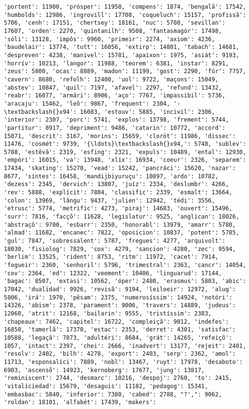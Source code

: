 \documentclass[11pt]{article}
\begin{document}
\begin{Verbatim}[commandchars=\\\{\}]
'portent': 11900, 'prósper': 11950, 'compens': 1874, 'bengalã': 17542, 'humbolds': 12986, 'ingrovill': 17708, 'coqueluch': 15157, 'profissã': 5706, 'cenh': 17151, 'chertsey': 18161, 'nuc': 5708, 'sevillan': 17607, 'orden': 2270, 'quintanilh': 9508, 'fantasmagór': 17498, 'sóli': 13128, 'impôs': 9960, 'primeir': 2274, 'axiom': 4236, 'baudelair': 13774, 'tutt': 16056, 'extirp': 14801, 'tabach': 14681, 'despreven': 4238, 'manivel': 15781, 'apaixon': 1975, 'asiát': 9193, 'horrív': 10213, 'langor': 11988, 'teorem': 6381, 'instar': 8291, 'zeus': 5800, 'ocas': 8889, 'madon': 11199, 'gost': 2290, 'fúr': 7757, 'cavern': 8680, 'refolh': 12400, 'uol': 9722, 'maçons': 15049, 'abstev': 10847, 'quil': 7197, 'afavel': 2297, 'refund': 13432, 'reabr': 16077, 'armári': 8906, 'aço': 7767, 'impassibil': 5736, 'aracaju': 15462, 'leõ': 9867, 'frequent': 2304, '-\textbackslash{}x94': 16083, 'estouv': 5885, 'incivil': 2306, 'interior': 2307, 'porc': 5741, 'explos': 13798, 'frement': 5744, 'partitur': 8917, 'depriment': 9486, 'catarin': 10772, 'accord': 15071, 'descrit': 3167, 'morins': 15659, 'clorót': 11986, 'dissec': 11476, 'cosmét': 9739, '{\ldots}\textbackslash{}x94,': 5748, 'sublev': 5788, 'estêvã': 2319, 'esfing': 2321, 'expuls': 10489, 'ental': 12930, 'empóri': 16015, 'va': 13948, 'xlix': 16934, 'coeur': 2326, 'separem': 17434, 'skating': 15270, 'vead': 15242, 'pancráci': 15620, 'nazar': 8677, 'síntes': 16458, 'mandijbiyuruçu': 10897, 'ardo': 10782, 'dezess': 2345, 'dervich': 13807, 'juíz': 2334, 'deslumbr': 4266, 'rev': 5888, 'explícit': 7804, 'classific': 2339, 'esmalt': 13664, 'colon': 13969, 'lângu': 9437, 'julien': 12942, 'tédi': 3556, 'etrusc': 5774, 'metrific': 4273, 'piraj': 14683, 'ouvert': 15496, 'surr': 7816, 'facçõ': 11628, 'legislatur': 9525, 'anglican': 18026, 'abstraçõ': 9700, 'esbarr': 2350, 'honorabl': 13979, 'amarr': 5780, 'almad': 11682, 'encanec': 7822, 'oposicion': 10837, 'potent': 5785, 'gul': 7847, 'sobressalent': 5787, 'fregues': 4277, 'arquivolt': 18030, 'fisiolog': 7829, 'cox': 4279, 'sancion': 4280, 'zec': 9594, 'berlim': 13525, 'rident': 8753, 'ritm': 11972, 'cacet': 7914, 'fogueir': 2360, 'senhoril': 5796, 'trimestral': 2363, 'cancr': 14054, 'cov': 2364, 'ed': 12322, 'veement': 10406, 'linguarud': 17144, 'bagac': 8507, 'extasi': 10562, 'óper': 2480, 'erasmus': 5803, 'abic': 17042, 'dualidad': 9926, 'revisã': 9194, 'leiloeir': 12972, 'alug': 5806, 'irá': 1970, 'pêsam': 2375, 'numerosíssim': 14924, 'notóri': 14326, 'abism': 2378, 'parament': 9006, 'travers': 14889, 'judeus': 12060, 'atrit': 12168, 'bailarin': 9555, 'tristíssim': 2383, 'chapeaux': 7462, 'capitel': 16722, 'compleiçã': 9012, 'indefes': 16850, 'tamerlã': 17370, 'estac': 2353, 'derret': 4301, 'satisfac': 10588, 'legaçã': 7873, 'adultéri': 8684, 'grát': 14265, 'refeiçõ': 1057, 'intact': 2397, 'chei': 2666, 'inadvert': 13177, 'rejeit': 2401, 'resolv': 2402, 'bilh': 4278, 'export': 2403, 'serp': 2362, 'amol': 11713, 'esponsalíci': 7889, 'nobl': 13467, 'ruyt': 17978, 'desaboto': 6903, 'ascensõ': 14923, 'kernoberg': 17677, 'jung': 13817, 'reminiscent': 2744, 'desmarc': 10216, 'despoj': 2760, 'to': 2415, 'vitaliciedad': 15679, 'desaguis': 11182, 'pedagog': 15341, 'embasbac': 5840, 'inferior': 7380, 'cabed': 2788, "?',": 9062, 'roldan': 18101, 'alfabét': 17439, 'makers': 
\end{Verbatim}
\end{document}
